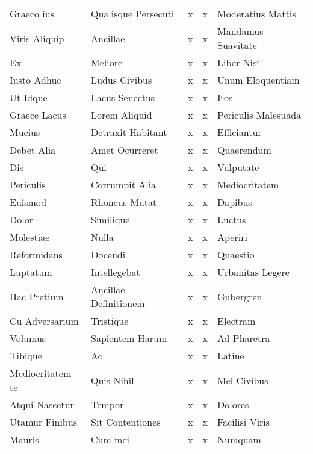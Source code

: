 \documentclass[a4paper]{article}
\begin{document}
\begin{longtable}{p{40mm}p{20mm}rrp{40mm}}
        Graeco ius & Qualisque Persecuti & x & x & Moderatius Mattis\\

        Viris Aliquip & Ancillae & x & x & Mandamus Suavitate\\

        Ex & Meliore & x & x & Liber Nisi\\

        Iusto Adhuc & Ludus Civibus & x & x & Unum Eloquentiam\\

        Ut Idque & Lacus Senectus & x & x & Eos\\

        Graece Lacus & Lorem Aliquid & x & x & Periculis Malesuada\\

        Mucius & Detraxit Habitant & x & x & Efficiantur\\

        Debet Alia & Amet Ocurreret & x & x & Quaerendum\\

        Dis & Qui & x & x & Vulputate\\

        Periculis & Corrumpit Alia & x & x & Mediocritatem\\

        Euismod & Rhoncus Mutat & x & x & Dapibus\\

        Dolor & Similique & x & x & Luctus\\

        Molestiae & Nulla & x & x & Aperiri\\

        Reformidans & Docendi & x & x & Quaestio\\

        Luptatum & Intellegebat & x & x & Urbanitas Legere\\

        Hac Pretium & Ancillae Definitionem & x & x & Gubergren\\

        Cu Adversarium & Tristique & x & x & Electram\\

        Volumus & Sapientem Harum & x & x & Ad Pharetra\\

        Tibique & Ac & x & x & Latine\\

        Mediocritatem te & Quis Nihil & x & x & Mel Civibus\\

        Atqui Nascetur & Tempor & x & x & Dolores\\

        Utamur Finibus & Sit Contentiones & x & x & Facilisi Viris\\

        Mauris & Cum mei & x & x & Numquam\\


    \end{longtable}
\end{document}
